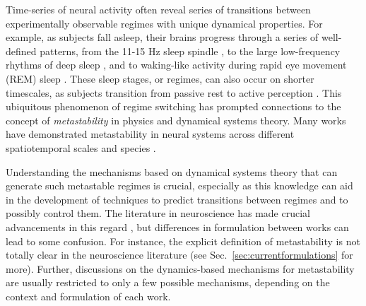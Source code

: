 Time-series of neural activity often reveal series of transitions between experimentally observable regimes with unique dynamical properties. For example, as subjects fall asleep, their brains progress through a series of well-defined patterns, from the 11-15 Hz sleep spindle \cite{contreras1996control}, to the large low-frequency rhythms of deep sleep \cite{steriade1993thalamocortical}, and to waking-like activity during rapid eye movement (REM) sleep \cite{jouvet1979does}. These sleep stages, or regimes, can also occur on shorter timescales, as subjects transition from passive rest to active perception \cite{poulet2008internal}. This ubiquitous phenomenon of regime switching has prompted connections to the concept of \textit{metastability} in physics and dynamical systems theory. Many works have demonstrated metastability in neural systems across different spatiotemporal scales and species \cite{michel2017eeg, vandeville2010eeg, lehmann1987eeg, jones2007natural, lacamera2019cortical, mazzucato2019expectation, recanatesi2021metastable, brinkman2022metastable, abeles1995cortical, seidemann1996simultaneously, jercog2017updown, luczak2007sequential, mazor2005transient, sasaki2007metastability, mashour2020conscious, dehaene2005ongoing, hudson2014recovery, tognoli2014metastable, popa2009constracting, curtis2015initiation, fernandez2020sleep, caruso2023single, lang2023temporal}.

Understanding the mechanisms based on dynamical systems theory that can generate such metastable regimes is crucial, especially as this knowledge can aid in the development of techniques to predict transitions between regimes and to possibly control them. The literature in neuroscience has made crucial advancements in this regard \cite{tognoli2014metastable, fingelkurts2017information, graben2019metastable, cavanna2018dynamic, brinkman2022metastable, fonollosa2015learning, deco2016metastability}, but differences in formulation between works can lead to some confusion. For instance, the explicit definition of metastability is not totally clear in the neuroscience literature (see Sec.~\ref{sec:currentformulations} for more). Further, discussions on the dynamics-based mechanisms for metastability are usually restricted to only a few possible mechanisms, depending on the context and formulation of each work.  

